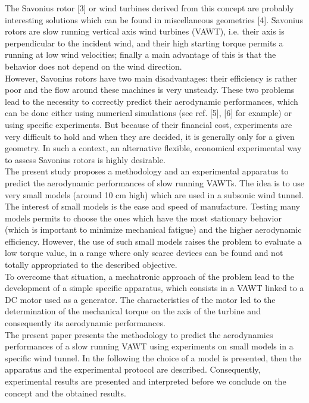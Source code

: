 \documentclass[a4paper,12pt]{article}
\begin{document}
The Savonius rotor [3] or wind turbines derived from this concept are probably interesting solutions which can be found in miscellaneous geometries [4]. Savonius rotors are slow running vertical axis wind turbines (VAWT), i.e. their axis is perpendicular to the incident wind, and their high starting torque permits a running at low wind velocities; finally a main advantage of this is that the behavior does not depend on the wind direction.\\

However, Savonius rotors have two main disadvantages: their efficiency is rather poor and the flow around these machines is very unsteady. These two problems lead to the necessity to correctly predict their aerodynamic performances, which can be done either using numerical simulations (see ref. [5], [6] for example) or using specific experiments. But because of their financial cost, experiments are very difficult to hold and when they are decided, it is generally only for a given geometry. In such a context, an alternative flexible, economical experimental way to assess Savonius rotors is highly desirable.\\

The present study proposes a methodology and an experimental apparatus to predict the aerodynamic performances of slow running VAWTs. The idea is to use very small models (around 10 cm high) which are used in a subsonic wind tunnel. The interest of small models is the ease and speed of manufacture. Testing many models permits to choose the ones which have the most stationary behavior (which is important to minimize mechanical fatigue) and the higher aerodynamic efficiency. However, the use of such small models raises the problem to evaluate a low torque value, in a range where only scarce devices can be found and not totally appropriated to the described objective.\\

To overcome that situation, a mechatronic approach of the problem lead to the development of a simple specific apparatus, which consists in a VAWT linked to a DC motor used as a generator. The characteristics of the motor led to the determination of the mechanical torque on the axis of the turbine and consequently its aerodynamic performances.\\

The present paper presents the methodology to predict the aerodynamics performances of a slow running VAWT using experiments on small models in a specific wind tunnel. In the following the choice of a model is presented, then the apparatus and the experimental protocol are described. Consequently, experimental results are presented and interpreted before we conclude on the concept and the obtained results.\\
\end{document}
